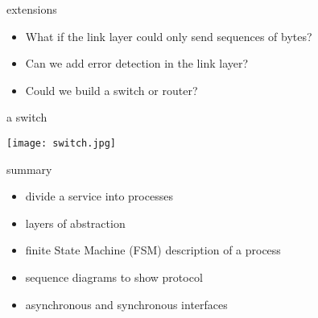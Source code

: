 \begin{frame}{extensions}

\begin{itemize}
  \item What if the link layer could only send sequences of bytes?  \pause
  \item Can we add error detection in the link layer? \pause
  \item Could we build a switch or router? \pause
\end{itemize}

\end{frame}

\begin{frame}{a switch}

\texttt{[image: switch.jpg]}

\end{frame}


\begin{frame}{summary}

\pause
\begin{itemize}
 \item divide a service into processes \pause
 \item layers of abstraction \pause
 \item finite State Machine (FSM) description of a process \pause
 \item sequence diagrams to show protocol \pause
 \item asynchronous and synchronous interfaces \pause
\end{itemize}

\vspace{20pt}{\em .. and hopefully, you have learned about communication stacks}
\end{frame}





